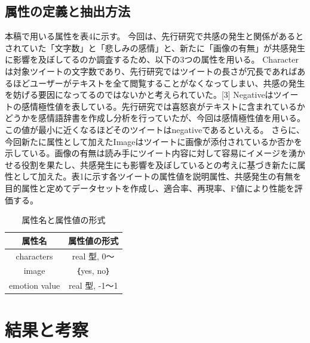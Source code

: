\documentclass[dvipdfmx]{issj}
\begin{document}
\subsection{属性の定義と抽出方法}  %
本稿で用いる属性を表4に示す。
今回は、先行研究で共感の発生と関係があるとされていた「文字数」と「悲しみの感情」と、新たに「画像の有無」が共感発生に影響を及ぼしてるのか調査するため、以下の3つの属性を用いる。
Characterは対象ツイートの文字数であり、先行研究ではツイートの長さが冗長であればあるほどユーザーがテキストを全て閲覧することがなくなってしまい、共感の発生を妨げる要因になってるのではないかと考えられていた。[3]
Negativeはツイートの感情極性値を表している。先行研究では喜怒哀がテキストに含まれているかどうかを感情語辞書を作成し分析を行っていたが、今回は感情極性値を用いる。この値が最小に近くなるほどそのツイートはnegativeであるといえる。
さらに、今回新たに属性として加えたImageはツイートに画像が添付されているか否かを示している。画像の有無は読み手にツイート内容に対して容易にイメージを湧かせる役割を果たし、共感発生にも影響を及ぼしているとの考えに基づき新たに属性として加えた。表1に示す各ツイートの属性値を説明属性、共感発生の有無を目的属性と定めてデータセットを作成し、適合率、再現率、F値により性能を評価する。



\begin{table}[htbp]\centering
\caption{属性名と属性値の形式}\label{tbl:font}
\begin{small}
\begin{tabular}{|c|c|} \hline
属性名            & 属性値の形式\\\hline\hline
characters         & real 型, 0～\\\hline
image & ｛yes, no｝\\\hline
emotion value     &  real 型, -1～1\\\hline
\end{tabular}
\end{small}
\end{table}

\newpage


\section{結果と考察}  %
\end{document}
